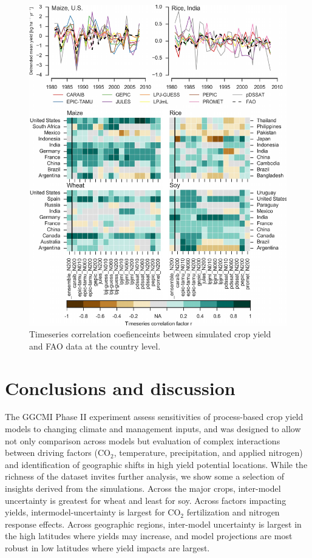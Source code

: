 \documentclass[preprint, 5p, times, twocolumn]{elsarticle}
\begin{document}
\begin{figure}[!htb]
    \centering
    \includegraphics[width=0.8\linewidth]{Phase_II_Validation.pdf}
    \caption{Timeseries correlation coefienceints between simulated crop yield and FAO data at the country level.}
    \label{fig:simulation_val}
\end{figure}


\section{Conclusions and discussion} 
\label{S:4}
The GGCMI Phase II experiment assess sensitivities of process-based crop yield models to changing climate and management inputs, and was designed to allow not only comparison across models but evaluation of complex interactions between driving factors (CO$_2$, temperature, precipitation, and applied nitrogen) and identification of geographic shifts in high yield potential locations. While the richness of the dataset invites further analysis, we show some a selection of insights derived from the simulations. Across the major crops, inter-model uncertainty is greatest for wheat and least for soy. Across factors impacting yields, intermodel-uncertainty is largest for CO$_2$ fertilization and nitrogen response effects. Across geographic regions, inter-model uncertainty is largest in the high latitudes where yields may increase, and model projections are most robust in low latitudes where yield impacts are largest.  
\end{document}
